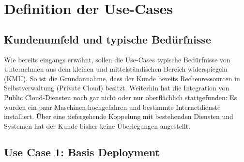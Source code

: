 \chapter{Definition der Use-Cases} \label{Umsetzung der Use-Cases und Evaluation}

\section{Kundenumfeld und typische Bedürfnisse} \label{Kundenumfeld und typische Bedürfnisse}


Wie bereits eingangs erwähnt, sollen die Use-Cases typische Bedürfnisse von Unternehmen aus dem kleinen und mittelständischen Bereich widerspiegeln (KMU). So ist die Grundannahme, dass der Kunde bereits Rechenressourcen in Selbstverwaltung (\glqq Private Cloud\grqq{}) besitzt. Weiterhin hat die Integration von Public Cloud-Diensten noch gar nicht oder nur oberflächlich stattgefunden: Es wurden ein paar Maschinen hochgefahren und bestimmte Internetdienste installiert. Über eine tiefergehende Koppelung mit bestehenden Diensten und Systemen hat der Kunde bisher keine Überlegungen angestellt. %


\section{Use Case 1: Basis Deployment}

